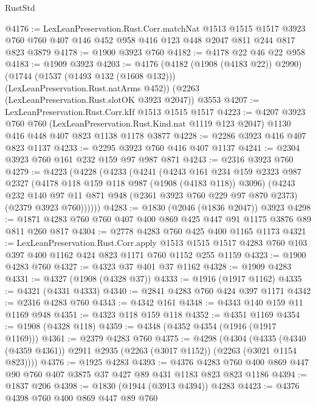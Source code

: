 \begin{lexlean}{RustStd}
\begin{coremodule}
@4176 := LexLeanPreservation.Rust.Corr.matchNat
    @1513
    @1515
    @1517
    @3923
    @760
    @760
    @407
    @146
    @452
    @958
    @416
    @123
    @448
    @2047
    @811
    @244
    @817
    @823
    @3879
@4178 := @1900 @3923 @760
@4182 := @4178 @22 @46 @22 @958
@4183 := @1909 @3923
@4203 := @4176
    (@4182 (@1908 (@4183 @22)) @2990)
    (@1744 (@1537 (@1493 @132 (@1608 @132))) (LexLeanPreservation.Rust.natArms @452))
    (@2263 (LexLeanPreservation.Rust.slotOK @3923 @2047))
    @3553
@4207 := LexLeanPreservation.Rust.Corr.kIf @1513 @1515 @1517
@4223 := @4207
    @3923
    @760
    @760
    (LexLeanPreservation.Rust.Kind.nat @1119 @123 @2047)
    @1130
    @416
    @448
    @407
    @823
    @1138
    @1178
    @3877
@4228 := @2286 @3923 @416 @407 @823 @1137
@4233 := @2295 @3923 @760 @416 @407 @1137
@4241 := @2304 @3923 @760 @161 @232 @159 @97 @987 @871
@4243 := @2316 @3923 @760
@4279 := @4223
    (@4228
      (@4233
        (@4241
          (@4243
            @161
            @234
            @159
            @2323
            @987
            @2327
            (@4178 @118 @159 @118 @987 (@1908 (@4183 @118)) @3096)
            (@4243
              @232
              @140
              @97
              @11
              @871
              @948
              (@2361 @3923 @760 @229 @97 @870 @2373)
              (@2379 @3923 @760))))))
@4283 := @1830 (@2046 (@1836 @2047)) @3923
@4298 := @1871 @4283 @760 @760 @407 @400 @869 @425 @447 @91 @1175 @3876 @89 @811 @260 @817
@4304 := @2778 @4283 @760 @425 @400 @1165 @1173
@4321 := LexLeanPreservation.Rust.Corr.apply
    @1513
    @1515
    @1517
    @4283
    @760
    @103
    @397
    @400
    @1162
    @424
    @823
    @1171
    @760
    @1152
    @255
    @1159
@4323 := @1900 @4283 @760
@4327 := @4323 @37 @401 @37 @1162
@4328 := @1909 @4283
@4331 := @4327 (@1908 (@4328 @37))
@4333 := @1916 (@1917 @1162)
@4335 := @4321 (@4331 @4333)
@4340 := @2841 @4283 @760 @424 @397 @1171
@4342 := @2316 @4283 @760
@4343 := @4342 @161
@4348 := @4343 @140 @159 @11 @1169 @948
@4351 := @4323 @118 @159 @118
@4352 := @4351 @1169
@4354 := @1908 (@4328 @118)
@4359 := @4348 (@4352 @4354 (@1916 (@1917 @1169)))
@4361 := @2379 @4283 @760
@4375 := @4298
    (@4304
      (@4335 (@4340 (@4359 @4361)) @2911 @2935 (@2263 (@3017 @1152)) (@2263 (@3021 @1154 @823))))
@4376 := @1925 @4283
@4393 := @4376 @4283 @760 @400 @869 @447 @90 @760 @407 @3875 @37 @427 @89 @431 @1183 @823 @823 @1186
@4394 := @1837 @206
@4398 := @1830 (@1944 (@3913 @4394)) @4283
@4423 := @4376
    @4398
    @760
    @400
    @869
    @447
    @89
    @760

\end{coremodule}
\end{lexlean}
